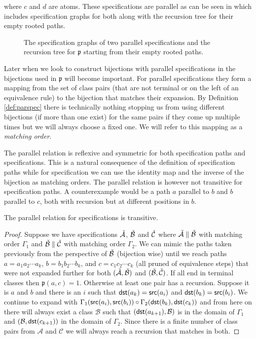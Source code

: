 where $c$ and $d$ are atoms. These specifications are parallel as can be seen in  which includes specification graphs for both along with the recursion tree for their empty rooted paths.
\begin{figure}[ht!]
    \centering
    
    \vspace{0.7cm}
    
    \caption{The specification graphs of two parallel specifications and the recursion tree for $\mathfrak{p}$ starting from their empty rooted paths.}
    \label{fig:para_spec}
\end{figure}

Later when we look to construct bijections with parallel specifications in  the bijections used in $\mathfrak{p}$ will become important. For parallel specifications they form a mapping from the set of class pairs (that are not terminal or on the left of an equivalence rule) to the bijection that matches their expansion. By Definition \ref{def:parspec} there is technically nothing stopping us from using different bijections (if more than one exist) for the same pairs if they come up multiple times but we will always choose a fixed one. We will refer to this mapping as a \emph{matching order}.

The parallel relation is reflexive and symmetric for both specification paths and specifications. This is a natural consequence of the definition of specification paths while for specification we can use the identity map and the inverse of the bijection as matching orders. The parallel relation is however not transitive for specification paths. A counterexample would be a path $a$ parallel to $b$ and $b$ parallel to $c$, both with recursion but at different positions in $b$.

\begin{proposition}
The parallel relation for specifications is transitive.
\end{proposition}
\begin{proof}
Suppose we have specifications $\check{\mathcal{A}}$, $\check{\mathcal{B}}$ and $\check{\mathcal{C}}$ where $\check{\mathcal{A}} \parallel \check{\mathcal{B}}$ with matching order $\Gamma_1$ and $\check{\mathcal{B}} \parallel \check{\mathcal{C}}$ with matching order $\Gamma_2$. We can mimic the paths taken previously from the perspective of $\check{\mathcal{B}}$ (bijection wise) until we reach paths $a = a_1a_2 \dotsm a_k$, $b = b_1b_2 \dotsm b_k$, and $c = c_1c_2 \dotsm c_k$ (all pruned of equivalence steps) that were not expanded further for both $(\check{\mathcal{A}},\check{\mathcal{B}})$ and $(\check{\mathcal{B}},\check{\mathcal{C}})$. If all end in terminal classes then $\mathfrak{p}(a,c)=1$. Otherwise at least one pair has a recursion. Suppose it is $a$ and $b$ and there is an $i$ such that $\textsf{dst}(a_k)=\textsf{src}(a_i)$ and $\textsf{dst}(b_k)=\textsf{src}(b_i)$. We continue to expand with $\Gamma_1(\textsf{src}(a_i),\textsf{src}(b_i)) \circ \Gamma_2(\textsf{dst}(b_k),\textsf{dst}(c_k))$ and from here on there will always exist a class $\mathcal{B}$ such that $(\textsf{dst}(a_{k+1}),\mathcal{B})$ is in the domain of $\Gamma_1$ and $(\mathcal{B}, \textsf{dst}(c_{k+1}))$ in the domain of $\Gamma_2$. Since there is a finite number of class pairs from $\mathcal{A}$ and $\mathcal{C}$ we will always reach a recursion that matches in both.
\end{proof}

